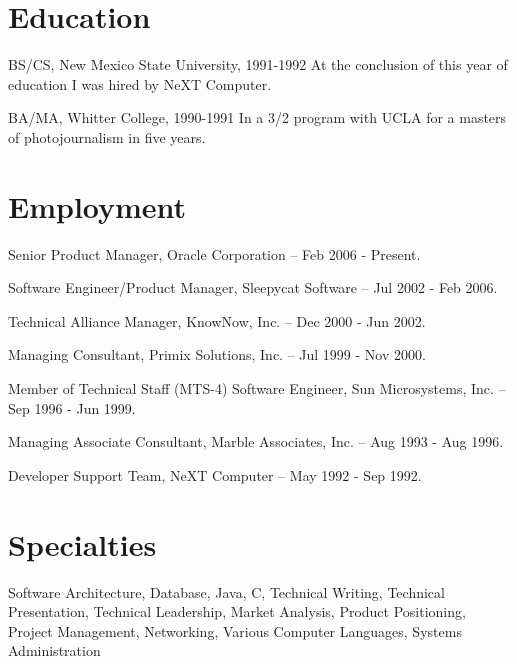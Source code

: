 \documentclass[letterpaper]{article}
\renewenvironment{itemize}{
  \begin{list}{}{
    \setlength{\leftmargin}{1.5em}
  }
}{
  \end{list}
}
\begin{document}
\section*{Education}

\begin{itemize}
  \item BS/CS, New Mexico State University, 1991-1992
    At the conclusion of this year of education I was hired by NeXT Computer.

  \item BA/MA, Whitter College, 1990-1991
    In a 3/2 program with UCLA for a masters of photojournalism in five years.
\end{itemize}


\section*{Employment}

\begin{itemize}
\item Senior Product Manager, Oracle Corporation -- Feb 2006 - Present.
\item Software Engineer/Product Manager, Sleepycat Software -- Jul 2002 - Feb 2006.
\item Technical Alliance Manager, KnowNow, Inc. -- Dec 2000 - Jun 2002.
\item Managing Consultant, Primix Solutions, Inc. -- Jul 1999 - Nov 2000.
\item Member of Technical Staff (MTS-4) Software Engineer, Sun Microsystems, Inc. -- Sep 1996 - Jun 1999.
\item Managing Associate Consultant, Marble Associates, Inc. -- Aug 1993 - Aug 1996.
\item Developer Support Team, NeXT Computer -- May 1992 - Sep 1992.
\end{itemize}

\section*{Specialties}

\begin{itemize}
\item Software Architecture, Database, Java, C, Technical Writing, Technical Presentation, Technical Leadership, Market Analysis, Product Positioning, Project Management, Networking, Various Computer Languages, Systems Administration
\end{itemize}
\end{document}
